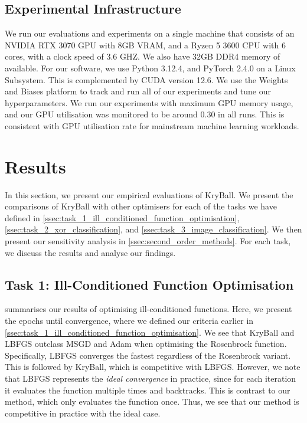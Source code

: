 \subsection{Experimental Infrastructure}
\label{ssec:experimental_infrastructure}
We run our evaluations and experiments on a single machine that consists of an NVIDIA RTX 3070 GPU with 8GB VRAM, and a Ryzen 5 3600 CPU with 6 cores, with a clock speed of 3.6 GHZ. We also have 32GB DDR4 memory of available. For our software, we use Python 3.12.4, and PyTorch 2.4.0 on a Linux Subsystem. This is complemented by CUDA version 12.6. We use the Weights and Biases platform to track and run all of our experiments and tune our hyperparameters. We run our experiments with maximum GPU memory usage, and our GPU utilisation was monitored to be around 0.30 in all runs. This is consistent with GPU utilisation rate for mainstream machine learning workloads.    

\section{Results}
\label{sec:results}
In this section, we present our empirical evaluations of KryBall. We present the comparisons of KryBall with other optimisers for each of the tasks we have defined in \cref{ssec:task_1_ill_conditioned_function_optimisation}, \cref{ssec:task_2_xor_classification}, and \cref{ssec:task_3_image_classification}. We then present our sensitivity analysis in \cref{ssec:second_order_methods}. For each task, we discuss the results and analyse our findings. 

\subsection{Task 1: Ill-Conditioned Function Optimisation}
\label{ssec:results_ill_conditioned_function_optimisation}

 summarises our results of optimising ill-conditioned functions. Here, we present the epochs until convergence, where we defined our criteria earlier in \cref{ssec:task_1_ill_conditioned_function_optimisation}. We see that KryBall and LBFGS outclass MSGD and Adam when optimising the Rosenbrock function. Specifically, LBFGS converges the fastest regardless of the Rosenbrock variant. This is followed by KryBall, which is competitive with LBFGS. However, we note that LBFGS represents the \textit{ideal convergence} in practice, since for each iteration it evaluates the function multiple times and backtracks. This is contrast to our method, which only evaluates the function once. Thus, we see that our method is competitive in practice with the ideal case. 

